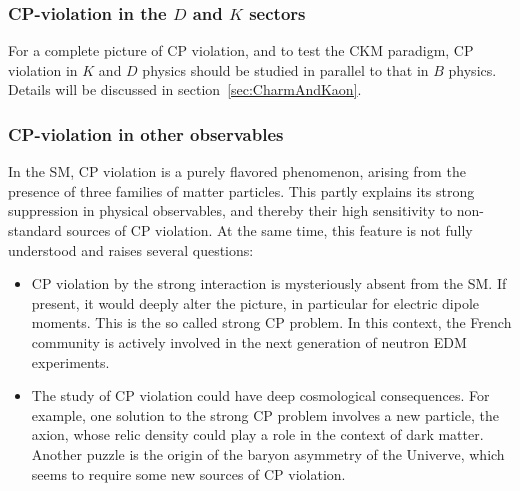 








\subsubsection*{CP-violation in the $D$ and $K$ sectors}

For a complete picture of CP violation, and to test the CKM paradigm, CP
violation in $K$ and $D$ physics should be studied in parallel to that in $B$
physics. Details will be discussed in section~\ref{sec:CharmAndKaon}. 


\subsubsection*{CP-violation in other observables}

In the SM, CP violation is a purely flavored phenomenon, arising from the
presence of three families of matter particles. This partly explains its
strong suppression in physical observables, and thereby their high sensitivity
to non-standard sources of CP violation. At the same time, this feature is not
fully understood and raises several questions:

\begin{itemize}
\item CP violation by the strong interaction is mysteriously absent from the
SM. If present, it would deeply alter the picture, in particular for electric
dipole moments. This is the so called strong CP problem. In this context, the
French community is actively involved in the next generation of neutron EDM experiments.

\item The study of CP violation could have deep cosmological consequences. For
example, one solution to the strong CP problem involves a new particle, the
axion, whose relic density could play a role in the context of dark matter.
Another puzzle is the origin of the baryon asymmetry of the Univerve, which
seems to require some new sources of CP violation.
\end{itemize}

